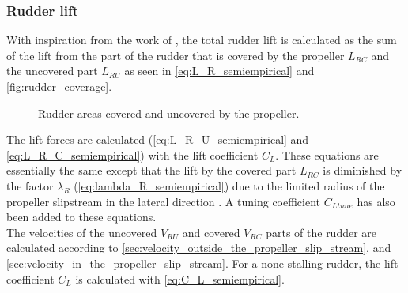 \subsubsection{Rudder lift}
\label{sec:rudder lift}
With inspiration from the work of \citet{villa_numerical_2020}, the total rudder lift is calculated as the sum of the lift from the part of the rudder that is covered by the propeller $L_{RC}$ and the uncovered part $L_{RU}$ as seen in \autoref{eq:L_R_semiempirical} and \autoref{fig:rudder_coverage}.
\begin{equation}
    \label{eq:L_R_semiempirical}
    
\end{equation}
%
\begin{figure}[h]
    \centering
    
    \caption{Rudder areas covered and uncovered by the propeller.}
    \label{fig:rudder_coverage}
\end{figure}
%
The lift forces are calculated (\autoref{eq:L_R_U_semiempirical} and \autoref{eq:L_R_C_semiempirical}) with the lift coefficient $C_L$. These equations are essentially the same except that the lift by the covered part $L_{RC}$ is diminished by the factor $\lambda_R$ (\autoref{eq:lambda_R_semiempirical}) due to the limited radius of the propeller slipstream in the lateral direction \citep{brix_manoeuvring_1993}. A tuning coefficient $C_{Ltune}$ has also been added to these equations.
\begin{equation}
    \label{eq:L_R_U_semiempirical}
    
\end{equation}
%
\begin{equation}
    \label{eq:L_R_C_semiempirical}
    
\end{equation}
The velocities of the uncovered $V_{RU}$ and covered $V_{RC}$ parts of the rudder are calculated according to \ref{sec:velocity_outside_the_propeller_slip_stream}, and \ref{sec:velocity_in_the_propeller_slip_stream}.
For a none stalling rudder, the lift coefficient $C_L$ is calculated with \autoref{eq:C_L_semiempirical}.
\begin{equation}
    \label{eq:C_L_semiempirical}
    
\end{equation}
%
\begin{equation}
    \label{eq:alpha_semiempirical}
    
\end{equation}
